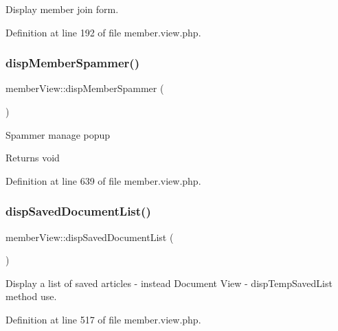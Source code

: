 Display member join form. 



Definition at line 192 of file member.\+view.\+php.

\hypertarget{classmemberView_a89f56007be451ba8c4136a2e25d343ec}{}\label{classmemberView_a89f56007be451ba8c4136a2e25d343ec} 
\subsubsection{\texorpdfstring{disp\+Member\+Spammer()}{dispMemberSpammer()}}
{\footnotesize\ttfamily member\+View\+::disp\+Member\+Spammer (\begin{DoxyParamCaption}{ }\end{DoxyParamCaption})}

Spammer manage popup

\begin{DoxyReturn}{Returns}
void 
\end{DoxyReturn}


Definition at line 639 of file member.\+view.\+php.

\hypertarget{classmemberView_a30c84f97c62c8767ebd86dc943ae2b28}{}\label{classmemberView_a30c84f97c62c8767ebd86dc943ae2b28} 
\subsubsection{\texorpdfstring{disp\+Saved\+Document\+List()}{dispSavedDocumentList()}}
{\footnotesize\ttfamily member\+View\+::disp\+Saved\+Document\+List (\begin{DoxyParamCaption}{ }\end{DoxyParamCaption})}



Display a list of saved articles  -\/ instead Document View -\/ disp\+Temp\+Saved\+List method use. 



Definition at line 517 of file member.\+view.\+php.

\hypertarget{classmemberView_a966e235b7cf76bcdddf07e601d7812b3}{}\label{classmemberView_a966e235b7cf76bcdddf07e601d7812b3} 
